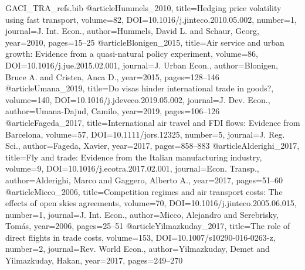\begin{filecontents*}[overwrite]{GACI_TRA_refs.bib}
@article{Hummels_2010, title={Hedging price volatility using fast transport}, volume={82}, DOI={10.1016/j.jinteco.2010.05.002}, number={1}, journal={J. Int. Econ.}, author={Hummels, David L. and Schaur, Georg}, year={2010}, pages={15--25} }
@article{Blonigen_2015, title={Air service and urban growth: Evidence from a quasi-natural policy experiment}, volume={86}, DOI={10.1016/j.jue.2015.02.001}, journal={J. Urban Econ.}, author={Blonigen, Bruce A. and Cristea, Anca D.}, year={2015}, pages={128--146} }
@article{Umana_2019, title={Do visas hinder international trade in goods?}, volume={140}, DOI={10.1016/j.jdeveco.2019.05.002}, journal={J. Dev. Econ.}, author={Umana-Dajud, Camilo}, year={2019}, pages={106--126} }
@article{Fageda_2017, title={International air travel and FDI flows: Evidence from {Barcelona}}, volume={57}, DOI={10.1111/jors.12325}, number={5}, journal={J. Reg. Sci.}, author={Fageda, Xavier}, year={2017}, pages={858--883} }
@article{Alderighi_2017, title={Fly and trade: Evidence from the {Italian} manufacturing industry}, volume={9}, DOI={10.1016/j.ecotra.2017.02.001}, journal={Econ. Transp.}, author={Alderighi, Marco and Gaggero, Alberto A.}, year={2017}, pages={51--60} }
@article{Micco_2006, title={Competition regimes and air transport costs: The effects of open skies agreements}, volume={70}, DOI={10.1016/j.jinteco.2005.06.015}, number={1}, journal={J. Int. Econ.}, author={Micco, Alejandro and Serebrisky, Tom\'as}, year={2006}, pages={25--51} }
@article{Yilmazkuday_2017, title={The role of direct flights in trade costs}, volume={153}, DOI={10.1007/s10290-016-0263-z}, number={2}, journal={Rev. World Econ.}, author={Yilmazkuday, Demet and Yilmazkuday, Hakan}, year={2017}, pages={249--270} }
\end{filecontents*}

\documentclass[review,3p,times,authoryear]{elsarticle}

\usepackage{lineno,hyperref}
\usepackage{amsmath,amssymb}
\usepackage{graphicx}
\usepackage{booktabs}
\usepackage{threeparttable}
\usepackage{multirow}
\usepackage{url}
\usepackage{float}

\providecommand{\DOIprefix}{}\renewcommand{\DOIprefix}{}
\providecommand{\URLprefix}{}\renewcommand{\URLprefix}{}
\providecommand{\doi}[1]{}\renewcommand{\doi}[1]{\href{https://doi.org/#1}{\nolinkurl{https://doi.org/#1}}}

